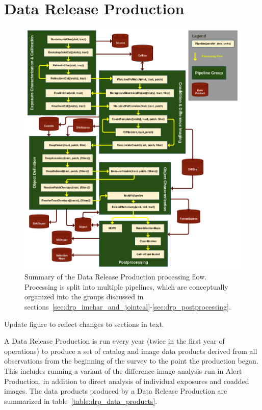 \section{Data Release Production}
\label{sec:drp}

\begin{figure}
\centering
\includegraphics[width=\textwidth]{figures/drp_summary.png}
\caption{Summary of the Data Release Production processing flow.  Processing is split into multiple pipelines, which are conceptually organized into the groups discussed in sections~\ref{sec:drp_imchar_and_jointcal}-\ref{sec:drp_postprocessing}.
\label{fig:drp_summary}}
\end{figure}

\begin{note}[TODO]
  Update figure to reflect changes to sections in text.
\end{note}

A Data Release Production is run every year (twice in the first year of operations) to produce a set of catalog and image data products derived from all observations from the beginning of the survey to the point the production began.  This includes running a variant of the difference image analysis run in Alert Production, in addition to direct analysis of individual exposures and coadded images.  The data products produced by a Data Release Production are summarized in table~\ref{table:drp_data_products}.


